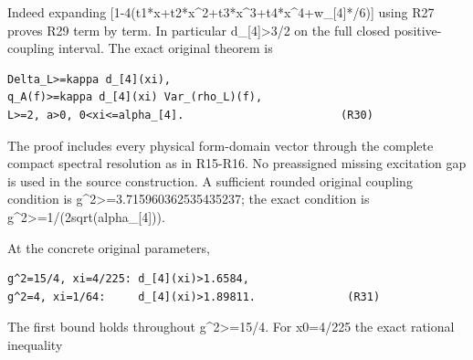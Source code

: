 \documentclass[11pt,a4paper]{article}
\renewcommand{\[}{\begingroup\small\originaldisplaystart}
\renewcommand{\]}{\originaldisplayend\endgroup}
\begin{document}
Indeed expanding
{\allowbreak{}[\allowbreak{}1\allowbreak{}-\allowbreak{}4\allowbreak{}(\allowbreak{}t\allowbreak{}1\allowbreak{}*\allowbreak{}x\allowbreak{}+\allowbreak{}t\allowbreak{}2\allowbreak{}*\allowbreak{}x\allowbreak{}\textasciicircum{}\allowbreak{}2\allowbreak{}+\allowbreak{}t\allowbreak{}3\allowbreak{}*\allowbreak{}x\allowbreak{}\textasciicircum{}\allowbreak{}3\allowbreak{}+\allowbreak{}t\allowbreak{}4\allowbreak{}*\allowbreak{}x\allowbreak{}\textasciicircum{}\allowbreak{}4\allowbreak{}+\allowbreak{}w\allowbreak{}\_\allowbreak{}[\allowbreak{}4\allowbreak{}]\allowbreak{}*\allowbreak{}/\allowbreak{}6\allowbreak{})\allowbreak{}]\allowbreak{}}
using R27 proves R29 term by term. In particular
d\_{[}4{]}\textgreater3/2 on the full closed positive-coupling interval.
The exact original theorem is

\begin{verbatim}
Delta_L>=kappa d_[4](xi),
q_A(f)>=kappa d_[4](xi) Var_(rho_L)(f),
L>=2, a>0, 0<xi<=alpha_[4].                        (R30)
\end{verbatim}

The proof includes every physical form-domain vector through the
complete compact spectral resolution as in R15-R16. No preassigned
missing excitation gap is used in the source construction. A sufficient
rounded original coupling condition is
{\ttfamily g\allowbreak{}\textasciicircum{}\allowbreak{}2\allowbreak{}\textgreater{}\allowbreak{}=\allowbreak{}3\allowbreak{}.\allowbreak{}7\allowbreak{}1\allowbreak{}5\allowbreak{}9\allowbreak{}6\allowbreak{}0\allowbreak{}3\allowbreak{}6\allowbreak{}2\allowbreak{}5\allowbreak{}3\allowbreak{}5\allowbreak{}4\allowbreak{}3\allowbreak{}5\allowbreak{}2\allowbreak{}3\allowbreak{}7\allowbreak{}};
the exact condition is
{\ttfamily g\allowbreak{}\textasciicircum{}\allowbreak{}2\allowbreak{}\textgreater{}\allowbreak{}=\allowbreak{}1\allowbreak{}/\allowbreak{}(\allowbreak{}2\allowbreak{}s\allowbreak{}q\allowbreak{}r\allowbreak{}t\allowbreak{}(\allowbreak{}a\allowbreak{}l\allowbreak{}p\allowbreak{}h\allowbreak{}a\allowbreak{}\_\allowbreak{}[\allowbreak{}4\allowbreak{}]\allowbreak{})\allowbreak{})\allowbreak{}}.

At the concrete original parameters,

\begin{verbatim}
g^2=15/4, xi=4/225: d_[4](xi)>1.6584,
g^2=4, xi=1/64:     d_[4](xi)>1.89811.              (R31)
\end{verbatim}

The first bound holds throughout g\^{}2\textgreater=15/4. For x0=4/225
the exact rational inequality
\end{document}
